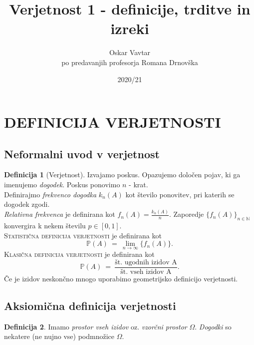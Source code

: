 \documentclass[11pt]{article}
\title{Verjetnost 1 - definicije, trditve in izreki}
\author{Oskar Vavtar \\
po predavanjih profesorja Romana Drnovška}
\date{2020/21}
\theoremstyle{definition}
\newtheorem{definicija}{Definicija}[section]
\theoremstyle{definition}
\theoremstyle{definition}
\begin{document}
\maketitle
\pagebreak
\tableofcontents
\pagebreak


\section{DEFINICIJA VERJETNOSTI}


\subsection{Neformalni uvod v verjetnost}

\begin{definicija}[Verjetnost]

Izvajamo poskus. Opazujemo določen pojav, ki ga imenujemo \textit{dogodek}. Poskus ponovimo $n$ - krat. \\
Definirajmo \textit{frekvenco dogodka} $k_n(A)$ kot število ponovitev, pri katerih se dogodek zgodi. \\
\textit{Relativna frekvenca} je definirana kot $f_n(A) = \frac{k_n(A)}{n}$.
Zaporedje $\{f_n(A)\}_{n \in \mathbb{N}}$ konvergira k nekem številu $p \in [0, 1].$ \\
\textsc{Statistična definicija verjetnosti} je definirana kot
$$\mathbb{P}(A) ~=~ \lim_{n\to\infty} \{f_n(A)\}.$$
\textsc{Klasična definicija verjetnosti} je definirana kot
$$\mathbb{P}(A) ~=~ \frac{\text{št. ugodnih izidov A}}{\text{št. vseh izidov A}}.$$
Če je izidov neskončno mnogo uporabimo geometrijsko definicijo verjetnosti.

\end{definicija}
\vspace{0.5cm}


\subsection{Aksiomična definicija verjetnosti}
\vspace{0.5cm}

\begin{definicija}

Imamo \textit{prostor vseh izidov} oz. \textit{vzorčni prostor} $\Omega$. \textit{Dogodki} so nekatere (ne nujno vse) podmnožice $\Omega$.

\end{definicija}
\vspace{0.5cm}
\end{document}
